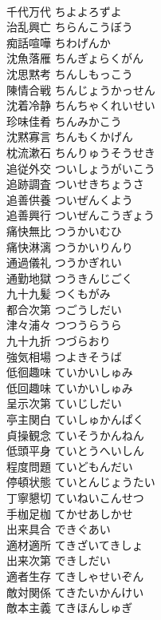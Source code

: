 \documentclass[8pt]{extreport}
\begin{document}
\begin{CJK}{UTF8}{min}
\\	千代万代	ちよよろずよ	
\\	治乱興亡	ちらんこうぼう	
\\	痴話喧嘩	ちわげんか	
\\	沈魚落雁	ちんぎょらくがん	
\\	沈思黙考	ちんしもっこう	
\\	陳情合戦	ちんじょうかっせん	
\\	沈着冷静	ちんちゃくれいせい	
\\	珍味佳肴	ちんみかこう	
\\	沈黙寡言	ちんもくかげん	
\\	枕流漱石	ちんりゅうそうせき	
\\	追従外交	ついしょうがいこう	
\\	追跡調査	ついせきちょうさ	
\\	追善供養	ついぜんくよう	
\\	追善興行	ついぜんこうぎょう	
\\	痛快無比	つうかいむひ	
\\	痛快淋漓	つうかいりんり	
\\	通過儀礼	つうかぎれい	
\\	通勤地獄	つうきんじごく	
\\	九十九髪	つくもがみ	
\\	都合次第	つごうしだい	
\\	津々浦々	つつうらうら	
\\	九十九折	つづらおり	
\\	強気相場	つよきそうば	
\\	低徊趣味	ていかいしゅみ	
\\	低回趣味	ていかいしゅみ	
\\	呈示次第	ていじしだい	
\\	亭主関白	ていしゅかんぱく	
\\	貞操観念	ていそうかんねん	
\\	低頭平身	ていとうへいしん	
\\	程度問題	ていどもんだい	
\\	停頓状態	ていとんじょうたい	
\\	丁寧懇切	ていねいこんせつ	
\\	手枷足枷	てかせあしかせ	
\\	出来具合	できぐあい	
\\	適材適所	てきざいてきしょ	
\\	出来次第	できしだい	
\\	適者生存	てきしゃせいぞん	
\\	敵対関係	てきたいかんけい	
\\	敵本主義	てきほんしゅぎ	

\end{CJK}
\end{document}
